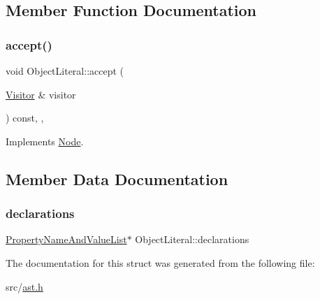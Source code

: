 \subsection{Member Function Documentation}
\mbox{\label{struct_object_literal_ac107a4d1da4363ece10d6823adbbf927}} 
\subsubsection{\texorpdfstring{accept()}{accept()}}
{\footnotesize\ttfamily void Object\+Literal\+::accept (\begin{DoxyParamCaption}\item[{\hyperlink{struct_visitor}{Visitor} \&}]{visitor }\end{DoxyParamCaption}) const\hspace{0.3cm}{\ttfamily [inline]}, {\ttfamily [override]}, {\ttfamily [virtual]}}



Implements \hyperlink{struct_node_a10bd7af968140bbf5fa461298a969c71}{Node}.



\subsection{Member Data Documentation}
\mbox{\label{struct_object_literal_acac683107c99000db5fd4c287235e919}} 
\subsubsection{\texorpdfstring{declarations}{declarations}}
{\footnotesize\ttfamily \hyperlink{struct_property_name_and_value_list}{Property\+Name\+And\+Value\+List}$\ast$ Object\+Literal\+::declarations}



The documentation for this struct was generated from the following file\+:\begin{DoxyCompactItemize}
\item 
src/\hyperlink{ast_8h}{ast.\+h}\end{DoxyCompactItemize}
